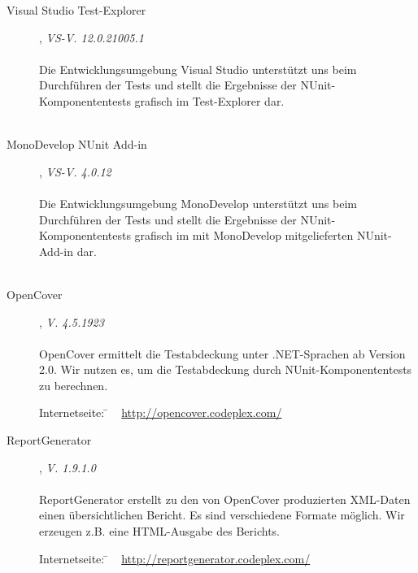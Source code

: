 \begin{description}

\item[Visual Studio Test-Explorer], \textit{VS-V. 12.0.21005.1}\hfill
	\\
	\\
	Die Entwicklungsumgebung Visual Studio unterstützt uns beim Durchführen der Tests und stellt die Ergebnisse der NUnit-Komponententests grafisch im Test-Explorer dar.
	\\\\

\item[MonoDevelop NUnit Add-in], \textit{VS-V. 4.0.12}\hfill
	\\
	\\
	Die Entwicklungsumgebung MonoDevelop unterstützt uns beim Durchführen der Tests und stellt die Ergebnisse der NUnit-Komponententests grafisch im mit MonoDevelop mitgelieferten NUnit-Add-in dar.
	\\\\



\label{Abschnitt:Tests:Werkzeuge:Automatisiert:OpenCover}

\item[OpenCover], \textit{V. 4.5.1923}\hfill
	\\
	\\
	OpenCover ermittelt die Testabdeckung unter .NET-Sprachen ab Version 2.0. Wir nutzen es, um die Testabdeckung durch NUnit-Komponententests zu berechnen.
	
	\begin{tabbing}
		Internetseite:
		\= ~ \href {http://opencover.codeplex.com/}
	    	       {http://opencover.codeplex.com/} \\
	\end{tabbing}
	
	
	\item[ReportGenerator], \textit{V. 1.9.1.0}\hfill
	\\
	\\
	ReportGenerator erstellt zu den von OpenCover produzierten XML-Daten einen übersichtlichen Bericht. Es sind verschiedene Formate möglich. Wir erzeugen z.B. eine HTML-Ausgabe des Berichts.
	\begin{tabbing}
			Internetseite:
			\= ~ \href {http://reportgenerator.codeplex.com/}
		    	       {http://reportgenerator.codeplex.com/}
		    \\
	\end{tabbing}


\end{description}
